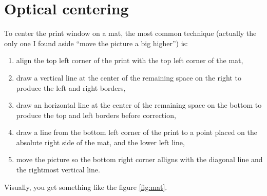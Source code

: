 \documentclass[
    paper=letter,
    parskip=half-,
    DIV=10,
]{scrreprt}
\begin{document}
\chapter{Optical centering}

    To center the print window on a mat, the most common technique (actually the only one I found aside “move the picture a big higher”) is:

    \begin{enumerate}
        \item align the top left corner of the print with the top left corner of the mat,
        \item draw a vertical line at the center of the remaining space on the right to produce the left and right borders,
        \item draw an horizontal line at the center of the remaining space on the bottom to produce the top and left borders before correction,
        \item draw a line from the bottom left corner of the print to a point placed on the absolute right side of the mat, and the lower left line,
        \item move the picture so the bottom right corner alligns with the diagonal line and the rightmost vertical line.
    \end{enumerate}

    Visually, you get something like the figure \ref{fig:mat}.
\end{document}
